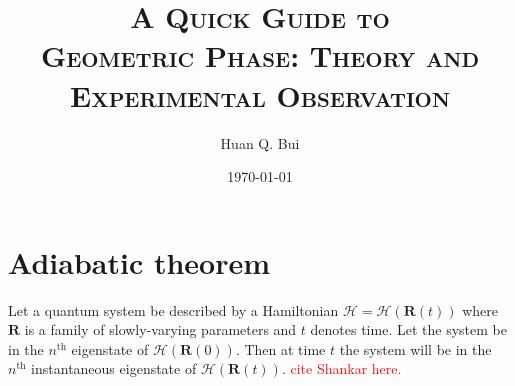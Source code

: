 \documentclass{article}
\theoremstyle{definition}
\begin{document}
	\begin{titlepage}\centering
		\clearpage
		\title{\textsc{$\,$\\$\,$\\$\,$\\$\,$\\$\,$\\ \bf{A Quick Guide to \\ Geometric Phase: Theory and Experimental Observation}}}
		\author{\bigskip Huan Q. Bui}
		\date{\today}
		\maketitle
		\thispagestyle{empty}
	\end{titlepage}




\newpage
\tableofcontents
\newpage




\section{Adiabatic theorem}

Let a quantum system be described by a Hamiltonian $\mathcal{H} = \mathcal{H}(\bm{R}(t))$ where $\bm{R}$ is a family of  slowly-varying parameters and $t$ denotes time.  Let the system be in the $n^\text{th}$ eigenstate of $\mathcal{H}(\bm{R}(0))$. Then at time $t$ the system will be in the $n^\text{th}$ instantaneous eigenstate of $\mathcal{H}(\bm{R}(t))$.  \textcolor{red}{cite Shankar here.}
\end{document}
